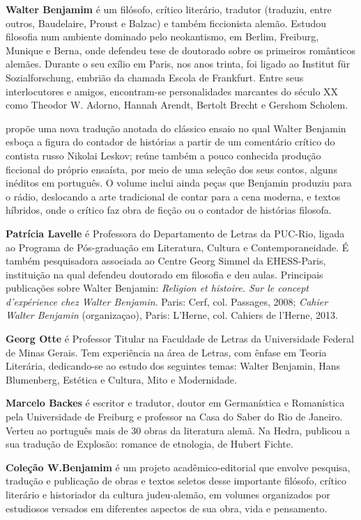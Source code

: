 
\textbf{Walter Benjamim} é um filósofo, crítico literário, tradutor (traduziu, entre outros, Baudelaire, Proust e Balzac) e também ficcionista alemão. Estudou filosofia num ambiente dominado pelo neokantismo, em Berlim, Freiburg, Munique e Berna, onde defendeu tese de doutorado sobre os primeiros românticos alemães. Durante o seu exílio em Paris, nos anos trinta, foi ligado ao Institut für Sozialforschung, embrião da chamada Escola de Frankfurt. Entre seus interlocutores e amigos, encontram-se personalidades marcantes do século XX como Theodor W. Adorno, Hannah Arendt, Bertolt Brecht e Gershom Scholem.

\textbf{\titulo} propõe uma nova tradução anotada do clássico ensaio no qual Walter Benjamin esboça a figura do contador de histórias a partir de um comentário crítico do contista russo Nikolai Leskov; reúne também a pouco conhecida produção ficcional do próprio ensaísta, por meio de uma seleção dos seus contos, alguns inéditos em português. O volume inclui ainda peças que Benjamin produziu para o rádio, deslocando a arte tradicional de contar para a cena moderna, e textos híbridos, onde o crítico faz obra de ficção ou o contador de histórias filosofa.

\textbf{Patrícia Lavelle} é Professora do Departamento de Letras da PUC-Rio, ligada ao Programa de Pós-graduação em Literatura, Cultura e Contemporaneidade. É também pesquisadora associada ao Centre Georg Simmel da EHESS-Paris, instituição na qual defendeu doutorado em filosofia e deu aulas. Principais publicações sobre Walter Benjamin: \emph{Religion et histoire. Sur le concept d’expérience chez Walter Benjamin}. Paris: Cerf, col. Passages, 2008; \emph{Cahier Walter Benjamin} (organizaçao), Paris: L’Herne, col. Cahiers de l’Herne, 2013. 

\textbf{Georg Otte} é Professor Titular na Faculdade de Letras da Universidade Federal de Minas Gerais. Tem experiência na área de Letras, com ênfase em Teoria Literária, dedicando-se ao estudo dos seguintes temas: Walter Benjamin, Hans Blumenberg, Estética e Cultura, Mito e Modernidade.

\textbf{Marcelo Backes} é escritor e tradutor, doutor em Germanística e Romanística pela Universidade de Freiburg e professor na Casa do Saber do Rio de Janeiro. Verteu ao português mais de 30 obras da literatura alemã. Na Hedra, publicou a sua tradução de Explosão: romance de etnologia, de Hubert Fichte.

\textbf{Coleção W.Benjamim} é um projeto acadêmico-editorial que envolve pesquisa, tradução e publicação de obras e textos seletos desse importante filósofo, crítico literário e historiador da cultura judeu-alemão, em volumes organizados por estudiosos versados em diferentes aspectos de sua obra, vida e pensamento. 

